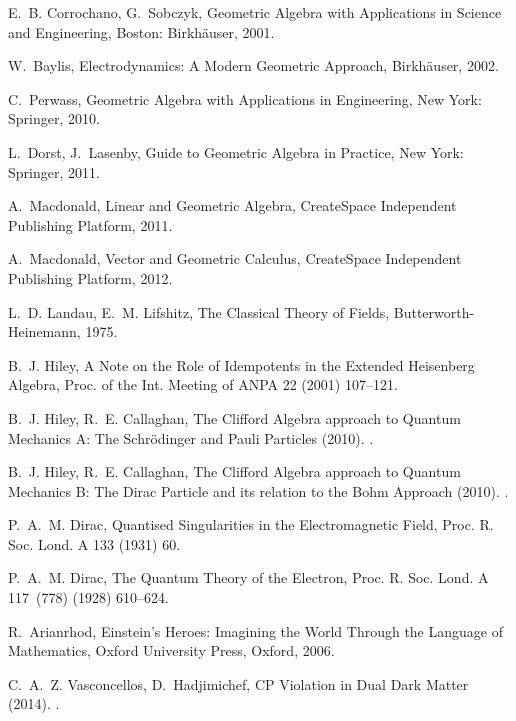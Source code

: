 \documentclass[1p,sort&compress]{elsarticle}
\numberwithin{equation}{section}
\begin{document}
\begin{thebibliography}{999}
E.~B. Corrochano, G.~Sobczyk, {Geometric Algebra with Applications in Science
  and Engineering}, Boston: Birkh\"auser, 2001.

W.~Baylis, {Electrodynamics: A Modern Geometric Approach}, Birkh\"auser, 2002.

C.~Perwass, {Geometric Algebra with Applications in Engineering}, New York:
  Springer, 2010.

L.~Dorst, J.~Lasenby, {Guide to Geometric Algebra in Practice}, New York:
  Springer, 2011.

A.~Macdonald, {Linear and Geometric Algebra}, CreateSpace Independent
  Publishing Platform, 2011.

A.~Macdonald, {Vector and Geometric Calculus}, CreateSpace Independent
  Publishing Platform, 2012.

L.~D. Landau, E.~M. Lifshitz, {The Classical Theory of Fields},
  Butterworth-Heinemann, 1975.

B.~J. Hiley, {A Note on the Role of Idempotents in the Extended Heisenberg
  Algebra}, Proc. of the Int. Meeting of ANPA 22 (2001) 107--121.

B.~J. Hiley, R.~E. Callaghan, {The Clifford Algebra approach to Quantum
  Mechanics A: The Schr\"odinger and Pauli Particles} (2010).
\newblock \href {http://arxiv.org/abs/1011.4031} {}.

B.~J. Hiley, R.~E. Callaghan, {The Clifford Algebra approach to Quantum
  Mechanics B: The Dirac Particle and its relation to the Bohm Approach}
  (2010).
\newblock \href {http://arxiv.org/abs/1011.4033} {}.

P.~A.~M. Dirac, {Quantised Singularities in the Electromagnetic Field}, Proc.
  R. Soc. Lond. A 133 (1931) 60.

P.~A.~M. Dirac, {The Quantum Theory of the Electron}, Proc. R. Soc. Lond. A
  117~(778) (1928) 610--624.

R.~Arianrhod, {Einstein's Heroes: Imagining the World Through the Language of
  Mathematics}, Oxford University Press, Oxford, 2006.

C.~A.~Z. Vasconcellos, D.~Hadjimichef, {CP Violation in Dual Dark Matter}
  (2014).
\newblock \href {http://arxiv.org/abs/arXiv:1404.0409}
  {}.


\end{thebibliography}
\end{document}
